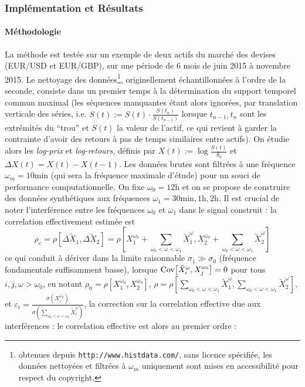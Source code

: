 \subsubsection{Implémentation et Résultats}

\paragraph{Méthodologie}

La méthode est testée sur un exemple de deux actifs du marché des devises (EUR/USD et EUR/GBP), sur une période de 6 mois de juin 2015 à novembre 2015. Le nettoyage des données\footnote{obtenues depuis \texttt{http://www.histdata.com/}, sans licence spécifiée, les données nettoyées et filtrées à $\omega_m$ uniquement sont mises en accessibilité pour respect du copyright.}, originellement échantillonnées à l'ordre de la seconde, consiste dans un premier temps à la détermination du support temporel commun maximal (les séquences manquantes étant alors ignorées, par translation verticale des séries, i.e. $S(t):=S(t)\cdot \frac{S(t_{n})}{S(t_{n-1})}$ lorsque $t_{n-1},t_n$ sont les extrémités du ``trou'' et $S(t)$ la valeur de l'actif, ce qui revient à garder la contrainte d'avoir des retours à pas de temps similaires entre actifs). On étudie alors les \emph{log-prix} et \emph{log-retours}, définis par $X(t):=\log{\frac{S(t)}{S_0}}$ et $\Delta X (t) = X(t) - X(t-1)$. Les données brutes sont filtrées à une fréquence $\omega_m = 10\textrm{min}$ (qui sera la fréquence maximale d'étude) pour un souci de performance computationnelle. On fixe $\omega_0=12\textrm{h}$ et on se propose de construire des données synthétiques aux fréquences $\omega_1 = 30\textrm{min},1\textrm{h},2\textrm{h}$. Il est crucial de noter l'interférence entre les fréquences $\omega_0$ et $\omega_1$ dans le signal construit : la correlation effectivement estimée est
\[
\rho_{e} = \rho \left[ \Delta \tilde{X}_1 , \Delta \tilde{X}_2 \right] = \rho \left[ X_1^{\omega_0} + \sum_{\omega_0 < \omega < \omega_1} \tilde{X}_1^{\omega} ,  X_2^{\omega_0} + \sum_{\omega_0 < \omega < \omega_1} \tilde{X}_2^{\omega}\right]
\]
ce qui conduit à dériver dans la limite raisonnable $\sigma_1 \gg \sigma_0$ (fréquence fondamentale suffisamment basse), lorsque $\operatorname{Cov}\!\left[\tilde{X}_i^{\omega},X_j^{\omega_0}\right]=0$ pour tous $i,j,\omega > \omega_0$, en notant $\rho_0 = \rho \left[X_1^{\omega_0} , X_2^{\omega_0} \right]$, $\rho = \rho \left[ \sum_{\omega_0 < \omega < \omega_1} \tilde{X}_1^{\omega} , \sum_{\omega_0 < \omega < \omega_1} \tilde{X}_2^{\omega} \right]$, et $\varepsilon_i = \frac{\sigma (X_i^{\omega_0})}{\sigma \left( \sum_{\omega_0 < \omega < \omega_1} \tilde{X}_i^{\omega}\right)}$, la correction sur la correlation effective due aux interférences : le correlation effective est alors au premier ordre :

